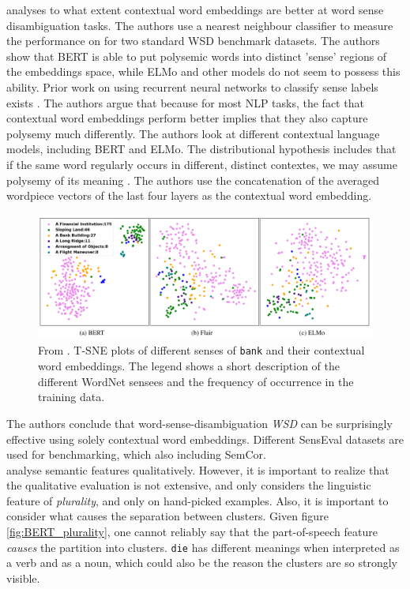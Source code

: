 \documentclass[a4paper,12pt,oneside,openright]{report}
\begin{document}
\cite{wiedmann19} analyses to what extent contextual word embeddings are better at word sense disambiguation tasks.
The authors use a nearest neighbour classifier to measure the performance on  for two standard WSD benchmark datasets.
The authors show that BERT is able to put polysemic words into distinct 'sense' regions of the embeddings space, while ELMo and other models do not seem to possess this ability.
Prior work on using recurrent neural networks to classify sense labels exists \cite{kageback16}.
The authors argue that because for most NLP tasks, the fact that contextual word embeddings perform better implies that they also capture polysemy much differently.
The authors look at different contextual language models, including BERT and ELMo.
The distributional hypothesis includes that if the same word regularly occurs in different, distinct contextes, we may assume polysemy of its meaning \cite{miller91}.
The authors use the concatenation of the averaged wordpiece vectors of the last four layers as the contextual word embedding.

\begin{figure}[h]
	\center
  \includegraphics[width=0.9\linewidth]{./assets/relatedwork/wsd_bert.png}
  \caption{From \cite{wiedmann19}. T-SNE plots of different senses of \texttt{bank} and their contextual word embeddings. The legend shows a short description of the different WordNet sensees and the frequency of occurrence in the training data.
  }
  \label{fig:bert_wsd}
\end{figure}

The authors conclude that word-sense-disambiguation \textit{WSD} can be surprisingly effective using solely contextual word embeddings.
Different SensEval datasets are used for benchmarking, which also including SemCor. \\

\cite{coenen19} analyse semantic features qualitatively.
However, it is important to realize that the qualitative evaluation is not extensive, and only considers the linguistic feature of \textit{plurality}, and only on hand-picked examples.
Also, it is important to consider what causes the separation between clusters.
Given figure \ref{fig:BERT_plurality}, one cannot reliably say that the part-of-speech feature \textit{causes} the partition into clusters.
\texttt{die} has different meanings when interpreted as a verb and as a noun, which could also be the reason the clusters are so strongly visible.
\end{document}

